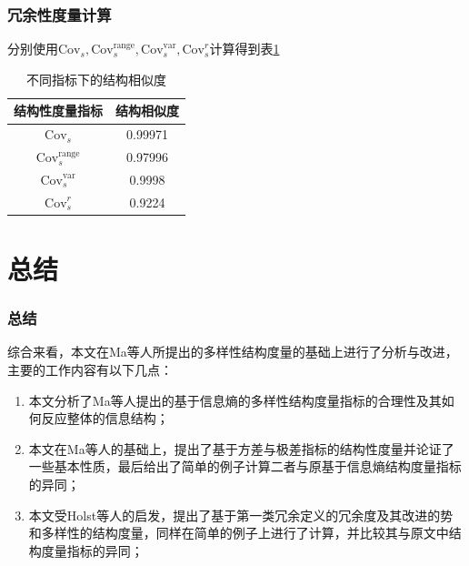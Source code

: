 \documentclass{../presentation}
\newcommand{\Cov}{\text{Cov}}
\begin{document}
    \begin{frame}
        \frametitle{冗余性度量计算}

        分别使用$\Cov_s, \Cov_s^{\text{range}}, \Cov_s^{\text{var}}, \Cov_s^r$计算得到表\ref{tbl:2}

    \begin{table}[ht]
        \centering
        \caption{不同指标下的结构相似度}
        \begin{tabular}{cc}
            \toprule
            结构性度量指标 & 结构相似度 \\
            \midrule
            $\Cov_s$ & 0.99971 \\
            $\Cov_s^{\text{range}}$ & 0.97996 \\
            $\Cov_s^{\text{var}}$ & 0.9998 \\
            $\Cov_s^r$ & 0.9224 \\
            \bottomrule
        \end{tabular}
        \label{tbl:2}
    \end{table}

    \end{frame}

    \section{总结}
    \begin{frame}
        \frametitle{总结}

        综合来看，本文在Ma等人所提出的多样性结构度量的基础上进行了分析与改进，主要的工作内容有以下几点：

        \begin{enumerate}
            \item 本文分析了Ma等人提出的基于信息熵的多样性结构度量指标的合理性及其如何反应整体的信息结构；
            \item 本文在Ma等人的基础上，提出了基于方差与极差指标的结构性度量并论证了一些基本性质，最后给出了简单的例子计算二者与原基于信息熵结构度量指标的异同；
            \item 本文受Holst等人的启发，提出了基于第一类冗余定义的冗余度及其改进的势和多样性的结构度量，同样在简单的例子上进行了计算，并比较其与原文中结构度量指标的异同；
        \end{enumerate}

    \end{frame}
\end{document}
